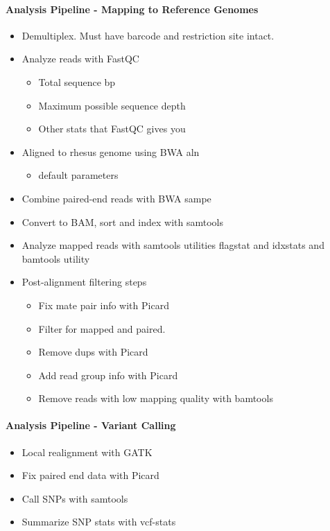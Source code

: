 \documentclass[12pt]{article}
\begin{document}
\paragraph{Analysis Pipeline - Mapping to Reference Genomes}
\begin{itemize}
	\item Demultiplex. Must have barcode and restriction site intact.
	\item Analyze reads with FastQC
	\begin{itemize}
		\item Total sequence bp
		\item Maximum possible sequence depth
		\item Other stats that FastQC gives you
	\end{itemize}
	\item Aligned to rhesus genome using BWA aln
	\begin{itemize}
		\item default parameters
	\end{itemize}
	\item Combine paired-end reads with BWA sampe
	\item Convert to BAM, sort and index with samtools
	\item Analyze mapped reads with samtools utilities flagstat and idxstats and bamtools utility 
	\item Post-alignment filtering steps
	\begin{itemize}
		\item Fix mate pair info with Picard
		\item Filter for mapped and paired.
		\item Remove dups with Picard
		\item Add read group info with Picard
		\item Remove reads with low mapping quality with bamtools
	\end{itemize}
\end{itemize}

\paragraph{Analysis Pipeline - Variant Calling}
\begin{itemize}
	\item Local realignment with GATK
	\item Fix paired end data with Picard
	\item Call SNPs with samtools
	\item Summarize SNP stats with vcf-stats
\end{itemize}
\end{document}
